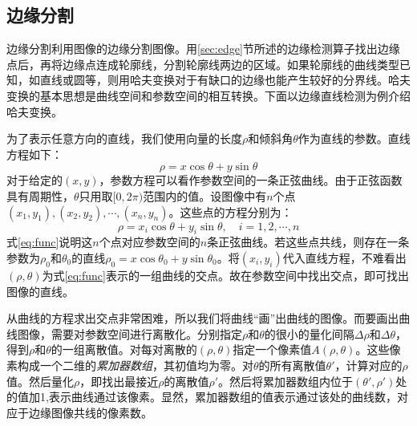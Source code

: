 \subsection{边缘分割}

边缘分割利用图像的边缘分割图像。用\ref{sec:edge}节所述的边缘检测算子找出边缘点后，再将边缘点连成轮廓线，分割轮廓线两边的区域。如果轮廓线的曲线类型已知，如直线或圆等，则用哈夫变换对于有缺口的边缘也能产生较好的分界线。哈夫变换的基本思想是曲线空间和参数空间的相互转换。下面以边缘直线检测为例介绍哈夫变换。%


为了表示任意方向的直线，我们使用向量的长度$\rho$和倾斜角$\theta$作为直线的参数。直线方程如下：
\begin{equation}
  \label{eq:polar}
  \rho=x\cos\theta+y\sin\theta
\end{equation}
对于给定的$(x,y)$，参数方程可以看作参数空间的一条正弦曲线。由于正弦函数具有周期性，$\theta$只用取$[0,2\pi)$范围内的值。设图像中有$n$个点$(x_1,y_1),(x_2,y_2),\cdots,(x_n,y_n)$。这些点的方程分别为：
\begin{equation}
\label{eq:func}
  \rho=x_i\cos\theta+y_i\sin\theta,\quad i=1,2,\cdots,n
\end{equation}
式\eqref{eq:func}说明这$n$个点对应参数空间的$n$条正弦曲线。若这些点共线，则存在一条参数为$\rho_0$和$\theta_0$的直线$\rho_0=x\cos\theta_0+y\sin\theta_0$。将$(x_i,y_i)$代入直线方程，不难看出$(\rho,\theta)$为式\eqref{eq:func}表示的一组曲线的交点。故在参数空间中找出交点，即可找出图像的直线。

从曲线的方程求出交点非常困难，所以我们将曲线“画”出曲线的图像。而要画出曲线图像，需要对参数空间进行离散化。分别指定$\rho$和$\theta$的很小的量化间隔$\Delta\rho$和$\Delta\theta$，得到$\rho$和$\theta$的一组离散值。对每对离散的$(\rho,\theta)$指定一个像素值$A(\rho,\theta)$。这些像素构成一个二维的\emph{累加器数组}，其初值均为零。对$\theta$的所有离散值$\theta'$，计算对应的$\rho$值。然后量化$\rho$，即找出最接近$\rho$的离散值$\rho'$。然后将累加器数组内位于$(\theta',\rho')$处的值加1,表示曲线通过该像素。显然，累加器数组的值表示通过该处的曲线数，对应于边缘图像共线的像素数。%

